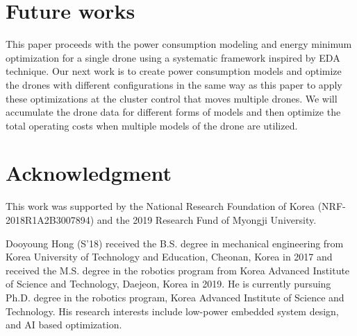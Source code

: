 \documentclass[journal]{./template/IEEEtran}
\begin{document}
\section{Future works}
This paper proceeds with the power consumption modeling and energy minimum optimization for a single drone using a systematic framework inspired by EDA technique. Our next work is to create power consumption models and optimize the drones with different configurations in the same way as this paper to apply these optimizations at the cluster control that moves multiple drones. We will accumulate the drone data for different forms of models and then optimize the total operating costs when multiple models of the drone are utilized.










\section*{Acknowledgment}
This work was supported by the National Research Foundation of Korea (NRF-2018R1A2B3007894) and the 2019 Research Fund of Myongji University. 



\begin{IEEEbiography}{Dooyoung Hong}
(S'18) received the B.S. degree in mechanical engineering from Korea University of Technology and Education, Cheonan, Korea in 2017 and received the M.S. degree in the robotics program from Korea Advanced Institute of Science and Technology, Daejeon, Korea in 2019. He is currently pursuing Ph.D. degree in the robotics program, Korea Advanced Institute of Science and Technology. His research interests include low-power embedded system design, and AI based optimization.
\end{IEEEbiography}
\end{document}
